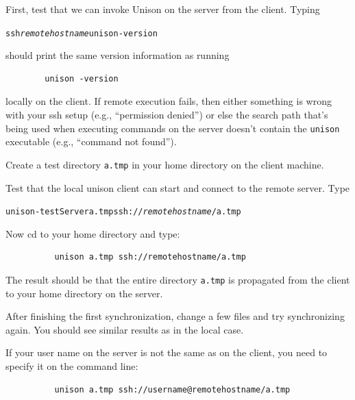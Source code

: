 \documentclass{article}
\newcommand{\NT}[1]{\textit{#1}}
\begin{document}
First, test that we can invoke Unison on the server from the client.
Typing
\begin{alltt}
        ssh \NT{remotehostname} unison -version
\end{alltt}
should print the same version information as running
\begin{verbatim}
        unison -version
\end{verbatim}
locally on the client.  If remote execution fails, then either
something is wrong with your ssh setup (e.g., ``permission denied'')
or else the search path that's being used when executing commands on
the server doesn't contain the \verb|unison| executable (e.g.,
``command not found'').

Create a test directory {\tt a.tmp} in your home directory on the client
machine.

Test that the local unison client can start and connect to the
remote server.  Type
\begin{alltt}
          unison -testServer a.tmp ssh://\NT{remotehostname}/a.tmp
\end{alltt}

Now cd to your home directory and type:
\begin{verbatim}
          unison a.tmp ssh://remotehostname/a.tmp
\end{verbatim}
The result should be that the entire directory {\tt a.tmp} is propagated
from the client to your home directory on the server.

After finishing the first synchronization, change a few files and try
synchronizing again.  You should see similar results as in the local
case.

If your user name on the server is not the same as on the client, you
need to specify it on the command line:
\begin{verbatim}
          unison a.tmp ssh://username@remotehostname/a.tmp
\end{verbatim}
\end{document}

